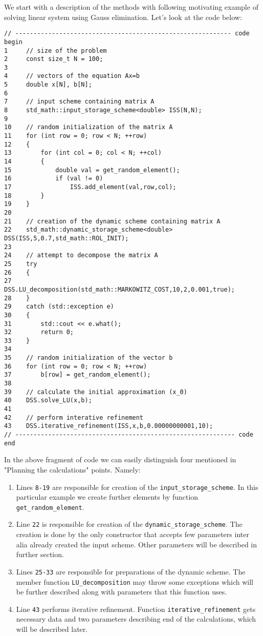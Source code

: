 We start with a description of the methods with following motivating example of solving linear system using Gauss elimination. Let's look at the code below:

\begin{verbatim}
// ----------------------------------------------------------- code begin
1     // size of the problem
2     const size_t N = 100; 
3
4     // vectors of the equation Ax=b           
5     double x[N], b[N];   
6
7     // input scheme containing matrix A          
8     std_math::input_storage_scheme<double> ISS(N,N); 
9
10    // random initialization of the matrix A
11    for (int row = 0; row < N; ++row)
12    {
13        for (int col = 0; col < N; ++col)
14        {
15            double val = get_random_element();
16            if (val != 0)
17                ISS.add_element(val,row,col);
18        }
19    }
20
21    // creation of the dynamic scheme containing matrix A
22    std_math::dynamic_storage_scheme<double> DSS(ISS,5,0.7,std_math::ROL_INIT);
23
24    // attempt to decompose the matrix A
25    try
26    {
27        DSS.LU_decomposition(std_math::MARKOWITZ_COST,10,2,0.001,true);
28    }
29    catch (std::exception e)
30    {
31        std::cout << e.what();
32        return 0;
33    }
34
35    // random initialization of the vector b
36    for (int row = 0; row < N; ++row)
37        b[row] = get_random_element();
38
39    // calculate the initial approximation (x_0)
40    DSS.solve_LU(x,b);
41
42    // perform interative refinement
43    DSS.iterative_refinement(ISS,x,b,0.00000000001,10);
// ------------------------------------------------------------ code end
\end{verbatim}

\noindent In the above fragment of code we can easily distinguish four mentioned in "Planning the calculations" points. Namely:
\begin{enumerate}
	\item Lines \texttt{8-19} are responsible for creation of the \texttt{input\_storage\_scheme}. In this particular example we create further elements by function \texttt{get\_random\_element}. 
	\item Line \texttt{22} is responsible for creation of the \texttt{dynamic\_storage\_scheme}. The creation is done by the only constructor that accepts few parameters inter alia already created the input scheme. Other parameters will be described in further section.
	\item Lines \texttt{25-33} are responsible for preparations of the dynamic scheme. The member function \texttt{LU\_decomposition} may throw some exceptions which will be further described along with parameters that this function uses.
	\item Line \texttt{43} performs iterative refinement. Function \texttt{iterative\_refinement} gets necessary data and two parameters describing end of the calculations, which will be described later. 
\end{enumerate}


